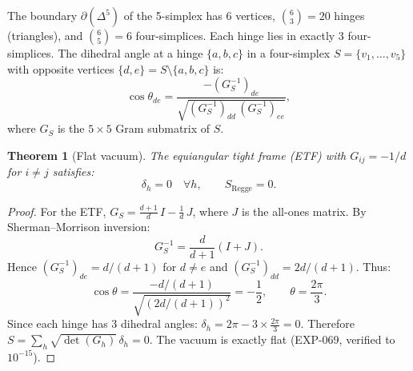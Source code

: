 \documentclass[12pt]{article}
\newtheorem{theorem}{Theorem}[section]
\theoremstyle{remark}
\theoremstyle{definition}
\begin{document}
The boundary $\partial(\Delta^5)$ of the 5-simplex has 6 vertices, $\binom{6}{3}=20$ hinges (triangles), and $\binom{6}{5}=6$ four-simplices.  Each hinge lies in exactly 3 four-simplices.  The dihedral angle at a hinge $\{a,b,c\}$ in a four-simplex $S = \{v_1,\ldots,v_5\}$ with opposite vertices $\{d,e\} = S \setminus \{a,b,c\}$ is:
\begin{equation}
\cos\theta_{de} = \frac{-(G^{-1}_S)_{de}}{\sqrt{(G^{-1}_S)_{dd}\,(G^{-1}_S)_{ee}}},
\end{equation}
where $G_S$ is the $5 \times 5$ Gram submatrix of $S$.

\begin{theorem}[Flat vacuum]
\label{thm:flat_vacuum}
The equiangular tight frame (ETF) with $G_{ij} = -1/d$ for $i \ne j$ satisfies:
\begin{equation}
\delta_h = 0 \quad \forall h, \qquad S_{\mathrm{Regge}} = 0.
\end{equation}
\end{theorem}
\begin{proof}
For the ETF, $G_S = \frac{d+1}{d}\,I - \frac{1}{d}\,J$, where $J$ is the all-ones matrix.  By Sherman--Morrison inversion:
\begin{equation}
G_S^{-1} = \frac{d}{d+1}(I + J).
\end{equation}
Hence $(G^{-1}_S)_{de} = d/(d+1)$ for $d \ne e$ and $(G^{-1}_S)_{dd} = 2d/(d+1)$.  Thus:
\begin{equation}
\cos\theta = \frac{-d/(d+1)}{\sqrt{(2d/(d+1))^2}} = -\frac{1}{2}, \qquad \theta = \frac{2\pi}{3}.
\end{equation}
Since each hinge has 3 dihedral angles: $\delta_h = 2\pi - 3 \times \frac{2\pi}{3} = 0$.  Therefore $S = \sum_h \sqrt{\det(G_h)}\,\delta_h = 0$.  The vacuum is exactly flat (EXP-069, verified to $10^{-15}$).
\end{proof}
\end{document}
